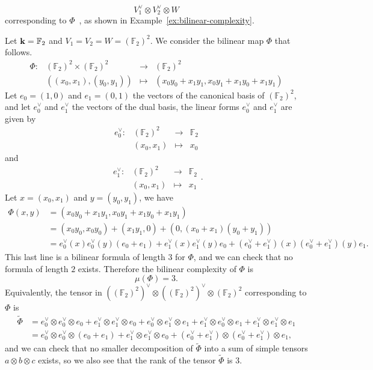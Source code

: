 \[
  V_1^\vee \otimes V_2^\vee \otimes W
\]
corresponding to $\Phi$~\cite{Randriam12}, as shown in Example~\ref{ex:bilinear-complexity}.
\begin{ex}
  \label{ex:bilinear-complexity}
  Let $\mathbf{k}=\mathbb{F}_2$ and $V_1=V_2=W=(\mathbb{F}_2)^2$. We consider the
  bilinear map $\Phi$ that follows.
\[
\begin{array}{llcl}
  \Phi:&(\mathbb{F}_2)^2\times (\mathbb{F}_{2})^2&\to&(\mathbb{F}_2)^2\\
  &((x_0, x_1), (y_0, y_1))&\mapsto&(x_0y_0+x_1y_1, x_0y_1+x_1y_0+x_1y_1)
\end{array}
\]
Let $e_0=(1,0)$ and $e_1=(0,1)$ the vectors of the canonical basis of
$(\mathbb{F}_{2})^2$, and let $e_0^\vee$ and $e_1^\vee$ the vectors of the dual
basis, \ie the linear forms $e_0^\vee$ and $e_1^\vee$ are given by
\[
\begin{array}{llcl}
  e_0^\vee:&(\mathbb{F}_2)^2&\to&\mathbb{F}_2\\
  &(x_0, x_1)&\mapsto&x_0
\end{array}
\]
and
\[
\begin{array}{llcl}
  e_1^\vee:&(\mathbb{F}_2)^2&\to&\mathbb{F}_2\\
  &(x_0, x_1)&\mapsto&x_1
\end{array}.
\]
Let $x = (x_0, x_1)$ and $y = (y_0, y_1)$, we have 
\begin{align*}
  \Phi(x,y) &= (x_0y_0+x_1y_1, x_0y_1+x_1y_0+x_1y_1) \\
  &= (x_0y_0, x_0y_0)+(x_1y_1, 0)+(0, (x_0+x_1)(y_0+y_1)) \\
  &=
  e_0^\vee(x)e_0^\vee(y)(e_0+e_1)+e_1^\vee(x)e_1^\vee(y)e_0+(e_0^\vee+e_1^\vee)(x)(e_0^\vee+e_1^\vee)(y)e_1.
\end{align*}
This last line is a bilinear formula of length $3$ for $\Phi$, and we can check
that no formula of length $2$ exists. Therefore the bilinear complexity of
$\Phi$ is 
\[
  \mu(\Phi) = 3.
\]
Equivalently, the tensor in
$((\mathbb{F}_2)^2)^\vee\otimes((\mathbb{F}_2)^2)^\vee\otimes(\mathbb{F}_2)^2$
corresponding to $\Phi$ is
\begin{align*}
  \widetilde{\Phi} &= e_0^\vee\otimes e_0^\vee\otimes e_0 + e_1^\vee\otimes
  e_1^\vee\otimes e_0 + e_0^\vee\otimes e_1^\vee\otimes e_1 + e_1^\vee\otimes
  e_0^\vee\otimes e_1 + e_1^\vee\otimes e_1^\vee\otimes e_1 \\
  &= e_0^\vee\otimes e_0^\vee\otimes(e_0+e_1)+e_1^\vee\otimes
  e_1^\vee\otimes e_0+(e_0^\vee+e_1^\vee)\otimes (e_0^\vee+e_1^\vee)\otimes e_1,
\end{align*}
and we can check that no smaller decomposition of $\widetilde\Phi$ into a sum of simple
tensors $a\otimes b\otimes c$ exists,
so we also see that the rank of the tensor $\widetilde\Phi$ is $3$.
\end{ex}
